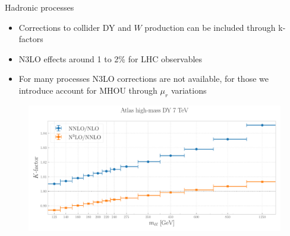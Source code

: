\documentclass[8pt,t]{beamer}
\begin{document}
\begin{frame}{Hadronic processes}
  \begin{itemize}
    \item Corrections to collider DY and $W$ production can be included through k-factors
    \item N3LO effects around 1 to 2\% for LHC observables
    \item For many processes N3LO corrections are not available, for those we introduce account for MHOU through $\mu_r$ variations
  \end{itemize}
  \begin{figure}[!t]
    \centering
    \includegraphics[width=.80\textwidth]{figures/kfactor_ATLASZHIGHMASS49FB.pdf}
  \end{figure}
\end{frame}

\end{document}
